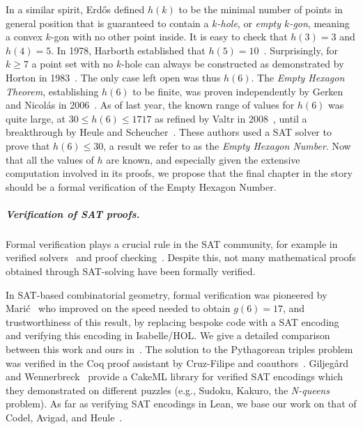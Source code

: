 In a similar spirit,
Erd\H{o}s defined $h(k)$
to be the minimal number of points in general position
that is guaranteed to contain a \emph{$k$-hole},
or \emph{empty $k$-gon},
meaning a convex $k$-gon with no other point inside.
It is easy to check that $h(3) = 3$ and $h(4) = 5$.
In 1978, Harborth established that $h(5) = 10$~\cite{Harborth1978}.
Surprisingly, for $k \geq 7$ a point set with no $k$-hole
can always be constructed
as demonstrated by Horton in 1983~\cite{hortonSetsNoEmpty1983}.
The only case left open was thus $h(6)$.
The \emph{Empty Hexagon Theorem},
establishing $h(6)$ to be finite,
was proven independently by Gerken and Nicolás in 2006~\cite{gerkenEmptyConvexHexagons2008,nicolasEmptyHexagonTheorem2007}.
As of last year,
the known range of values for $h(6)$ was quite large,
at $30 \leq h(6) \leq 1717$
as refined by Valtr in 2008~\cite{valtr},
until a breakthrough by Heule and Scheucher~\cite{emptyHexagonNumber}.
These authors used a SAT solver
to prove that $h(6) \leq 30$,
a result we refer to as the \emph{Empty Hexagon Number}.
Now that all the values of $h$ are known,
and especially given the extensive computation involved in its proofs,
we propose that the final chapter in the story
should be a formal verification of the Empty Hexagon Number.

\subparagraph*{Verification of SAT proofs.}
Formal verification plays a crucial rule in the SAT community,
for example in verified solvers~\cite{10maric_formal_verification_modern_sat_solver_shallow_embedding_isabelle_hol,oeVersatVerifiedModern2012,skotam_creusat_2022}
and proof checking~\cite{lammichEfficientVerifiedSAT2020,tanVerifiedPropagationRedundancy2023}.
Despite this,
not many mathematical proofs obtained through SAT-solving
have been formally verified.

In SAT-based combinatorial geometry,
formal verification was pioneered by Marić~\cite{19maric_fast_formal_proof_erdos_szekeres_conjecture_convex_polygons_most_six_points}
who improved on the speed needed to obtain $g(6) = 17$,
and trustworthiness of this result,
by replacing bespoke code with a SAT encoding
and verifying this encoding in \textsf{Isabelle/HOL}.
We give a detailed comparison between this work and ours in~.
The solution to the Pythagorean triples problem
was verified in the \textsf{Coq} proof assistant
by Cruz-Filipe and coauthors~\cite{formalPythagoreanTriples,LPAR-21:Formally_Proving_Boolean_Pythagorean}.
Giljeg\r{a}rd and Wennerbreck~\cite{GilAndWennerbeck} provide a \textsf{CakeML} library
for verified SAT encodings
which they demonstrated on different puzzles
(e.g., Sudoku, Kakuro, the \emph{N-queens} problem).
As far as verifying SAT encodings in Lean,
we base our work on that of Codel, Avigad, and Heule~\cite{Cayden}.

